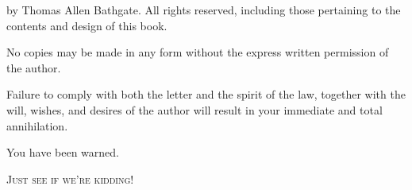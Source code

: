 \documentclass[12pt]{memoir}
\begin{document}
\begin{titlingpage}
\thispagestyle{empty}
\begin{center}
 by Thomas Allen Bathgate. All rights reserved, including those pertaining to the contents and design of this book. 
\par\end{center}

\begin{center}
\vspace{0.25in}
 \end{center}

\begin{center}
No copies may be made in any form without the express written permission of the author. 
\end{center}

\begin{center}
\vspace{0.25in}
 \end{center}

\begin{center}
Failure to comply with both the letter and the spirit of the law, together with the will, wishes, and desires of the author will result in your immediate and total annihilation. 
\par\end{center}

\begin{center}
\vspace{0.25in}
 \end{center}

\begin{center}
You have been warned. 
\par\end{center}

\begin{center}
\vfill{}
 
\par\end{center}

\begin{center}
\textsc{Just see if we're kidding!} 
\end{center}
\end{titlingpage}




\renewcommand*{\contentsname}{Short contents}
\setcounter{tocdepth}{0}%
\tableofcontents

\begin{comment}
\clearpage

\renewcommand*{\contentsname}{Contents}
\setcounter{tocdepth}{2}%
\tableofcontents


\end{comment}
\end{document}
